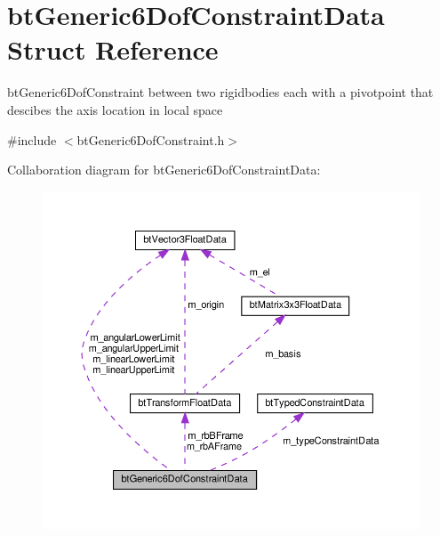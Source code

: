 \hypertarget{structbtGeneric6DofConstraintData}{}\section{bt\+Generic6\+Dof\+Constraint\+Data Struct Reference}
\label{structbtGeneric6DofConstraintData}


bt\+Generic6\+Dof\+Constraint between two rigidbodies each with a pivotpoint that descibes the axis location in local space  




{\ttfamily \#include $<$bt\+Generic6\+Dof\+Constraint.\+h$>$}



Collaboration diagram for bt\+Generic6\+Dof\+Constraint\+Data\+:
\nopagebreak
\begin{figure}[H]
\begin{center}
\leavevmode
\includegraphics[width=350pt]{structbtGeneric6DofConstraintData__coll__graph}
\end{center}
\end{figure}
